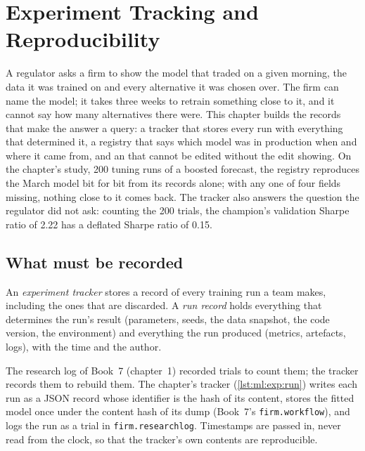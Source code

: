 \chapter{Experiment Tracking and Reproducibility}\label{ch:ml:experiment-tracking-and-reproducibility}

A regulator asks a firm to show the model that traded on a given morning, the data it was trained on and every alternative
it was chosen over. The firm can name the model; it takes three weeks to retrain something close to it, and it cannot say how
many alternatives there were. This chapter builds the records that make the answer a query: a tracker that stores every run
with everything that determined it, a registry that says which model was in production when and where it came from, and an
 that cannot be edited without the edit showing. On the chapter's study, 200 tuning runs of a boosted forecast, the
registry reproduces the March model bit for bit from its records alone; with any one of four fields missing, nothing close to
it comes back. The tracker also answers the question the regulator did not ask: counting the 200 trials, the champion's
validation Sharpe ratio of 2.22 has a deflated Sharpe ratio of 0.15.

\section{What must be recorded}

\begin{definition}\label{def:ml:experiment-tracking-and-reproducibility:tracker}
An \emph{experiment tracker} stores a record of every training run a team makes, including the
ones that are discarded. A \emph{run record} holds
everything that determines the run's result (parameters, seeds, the data snapshot, the code version, the environment) and
everything the run produced (metrics, artefacts, logs), with the time and the author.
\end{definition}

The research log of Book~7 (chapter~1) recorded trials to count them; the tracker records them to rebuild them. The chapter's
tracker (\cref{lst:ml:exp:run}) writes each run as a JSON record whose identifier is the hash of its content, stores the fitted
model once under the content hash of its dump (Book~7's \texttt{firm.workflow}), and logs the run as a trial in
\texttt{firm.researchlog}. Timestamps are passed in, never read from the clock, so that the tracker's own contents are
reproducible.

